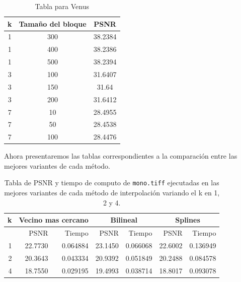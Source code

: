 \documentclass[a4paper]{article}
\newcounter{col}
\begin{document}
\begin{table}[h]
\centering
\label{my-label}
\begin{tabular}{|c|c|c|}
\hline
k & Tamaño del bloque & PSNR    \\ \hline
1 & 300               & 38.2384 \\ \hline
1 & 400               & 38.2386 \\ \hline
1 & 500               & 38.2394 \\ \hline
3 & 100               & 31.6407 \\ \hline
3 & 150               & 31.64   \\ \hline
3 & 200               & 31.6412 \\ \hline
7 & 10                & 28.4955 \\ \hline
7 & 50                & 28.4538 \\ \hline
7 & 100               & 28.4476 \\ \hline
\end{tabular}
\caption{Tabla para Venus}
\end{table}

Ahora presentaremos las tablas correspondientes a la comparación entre las mejores variantes de cada método.
\begin{table}[H]
\centering
\begin{tabular}{|r|r|r|r|r|r|r|}
\hline
\multicolumn{1}{|c|}{k} & \multicolumn{2}{|c|}{Vecino mas cercano} & \multicolumn{2}{|c|}{Bilineal} & \multicolumn{2}{|c|}{Splines} \\ \hline
  & PSNR & Tiempo & PSNR & Tiempo & PSNR & Tiempo \\ \hline
1 & 22.7730 & 0.064884 & 23.1450 & 0.066068 &  22.6002 & 0.136949 \\ \hline
2 & 20.3643 & 0.043334 & 20.9392 & 0.051849 &  20.2488 & 0.084578 \\ \hline
4 & 18.7550 & 0.029195 & 19.4993 & 0.038714 &  18.8017 & 0.093078 \\ \hline
\end{tabular}
\caption{Tabla de PSNR y tiempo de computo de \texttt{mono.tiff} ejecutadas en las mejores variantes de cada m\'etodo de interpolaci\'on variando el k en 1, 2 y 4.}
\label{}
\end{table}
\end{document}
